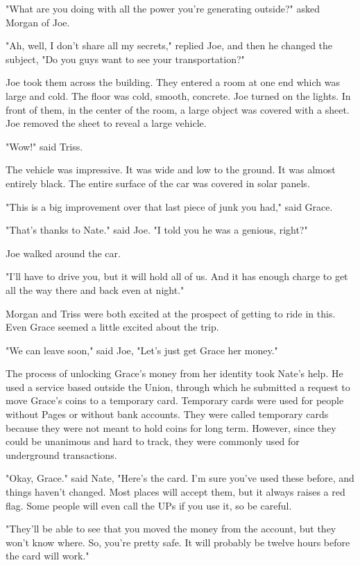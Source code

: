\documentclass[courier]{sffms}
\begin{document}
"What are you doing with all the power you're
generating outside?" asked Morgan of Joe.

"Ah, well, I don't share all my secrets," replied Joe,
and then he changed the subject, "Do you guys want
to see your transportation?"

Joe took them across the building. They entered a
room at one
end which was large and cold. The floor was cold,
smooth, concrete. Joe turned on the lights. In front
of them, in the center of the room, a large object
was covered with a sheet. Joe removed the sheet
to reveal a large vehicle.

"Wow!" said Triss.

The vehicle was impressive. It was wide and
low to the ground. It was almost entirely black.
The entire surface of the car was covered in 
solar panels.

"This is a big improvement over that last piece
of junk you had," said Grace.

"That's thanks to Nate." said Joe.
"I told you he was a
genious, right?"

Joe walked around the car.

"I'll have to drive you, but it will hold all of us.
And it has enough charge to get all the way
there and back even at night."

Morgan and Triss were both excited at the prospect
of getting to ride in this. Even Grace seemed a
little excited about the trip.

"We can leave soon," said Joe, "Let's just get
Grace her money."

The process of unlocking Grace's money from
her identity took Nate's help. He used a service
based outside the Union, through which he
submitted a request to move Grace's coins to
a temporary card. Temporary cards were used
for people without Pages or without bank
accounts. They were called temporary cards
because they were not meant to hold coins for
long term. However, since they could be
unanimous and hard to track, they were commonly
used for underground transactions.

"Okay, Grace." said Nate, "Here's
the card. I'm sure you've
used these before, and things haven't changed.
Most places will accept them, but it always raises
a red flag. Some people will even call the UPs if
you use it, so be careful.

"They'll be able to see that you moved the money
from the account, but they won't know where. So,
you're pretty safe. It will probably be twelve hours
before the card will work."
\end{document}
